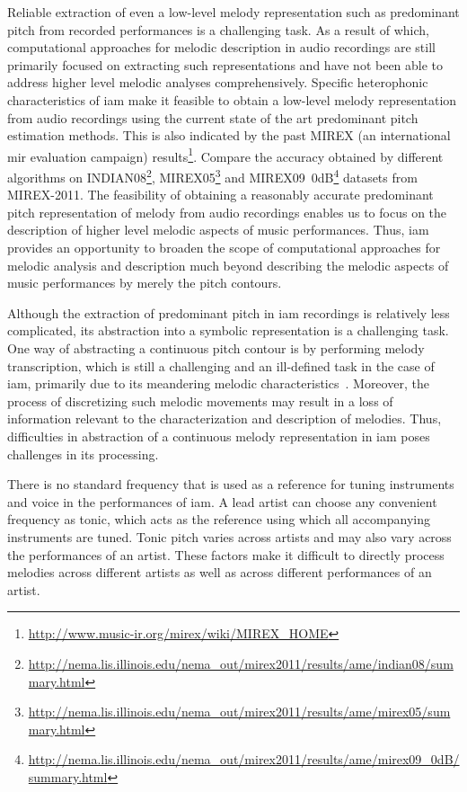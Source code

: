 Reliable extraction of even a low-level melody representation such as predominant pitch from recorded performances is a challenging task. As a result of which, computational approaches for melodic description in audio recordings are still primarily focused on extracting such representations and have not been able to address higher level melodic analyses comprehensively. Specific heterophonic characteristics of \gls{iam} make it feasible to obtain a low-level melody representation from audio recordings using the current state of the art predominant pitch estimation methods. This is also indicated by the past MIREX (an international \gls{mir} evaluation campaign) results\footnote{\url{http://www.music-ir.org/mirex/wiki/MIREX_HOME}}. Compare the accuracy obtained by different algorithms on INDIAN08\footnote{\url{http://nema.lis.illinois.edu/nema_out/mirex2011/results/ame/indian08/summary.html}}, MIREX05\footnote{\url{http://nema.lis.illinois.edu/nema_out/mirex2011/results/ame/mirex05/summary.html}} and MIREX09~0dB\footnote{\url{http://nema.lis.illinois.edu/nema_out/mirex2011/results/ame/mirex09_0dB/summary.html}} datasets from MIREX-2011. The feasibility of obtaining a reasonably accurate predominant pitch representation of melody from audio recordings enables us to focus on the description of higher level melodic aspects of music performances. Thus, \gls{iam} provides an opportunity to broaden the scope of computational approaches for melodic analysis and description much beyond describing the melodic aspects of music performances by merely the pitch contours.

Although the extraction of predominant pitch in \gls{iam} recordings is relatively less complicated, its abstraction into a symbolic representation is a challenging task. One way of abstracting a continuous pitch contour is by performing melody transcription, which is still a challenging and an ill-defined task in the case of \gls{iam}, primarily due to its meandering melodic characteristics~\citep{widdess1994involving,rao1999raga}. Moreover, the process of discretizing such melodic movements may result in a loss of information relevant to the characterization and description of melodies. Thus, difficulties in abstraction of a continuous melody representation in \gls{iam} poses challenges in its processing. 

There is no standard frequency that is used as a reference for tuning instruments and voice in the performances of \gls{iam}. A lead artist can choose any convenient frequency as tonic, which acts as the reference using which all accompanying instruments are tuned. Tonic pitch varies across artists and may also vary across the performances of an artist. These factors make it difficult to directly process melodies across different artists as well as across different performances of an artist.


